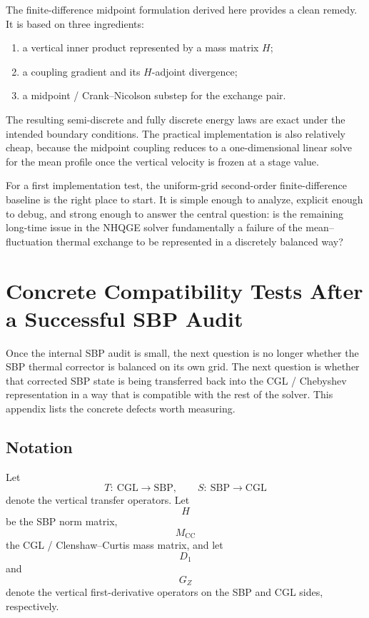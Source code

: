 \documentclass[11pt]{article}
\begin{document}
The finite-difference midpoint formulation derived here provides a clean remedy. It is based on three ingredients:

\begin{enumerate}[label=\arabic*.]
\item a vertical inner product represented by a mass matrix $H$;
\item a coupling gradient and its $H$-adjoint divergence;
\item a midpoint / Crank--Nicolson substep for the exchange pair.
\end{enumerate}

The resulting semi-discrete and fully discrete energy laws are exact under the intended boundary conditions. The practical implementation is also relatively cheap, because the midpoint coupling reduces to a one-dimensional linear solve for the mean profile once the vertical velocity is frozen at a stage value.

For a first implementation test, the uniform-grid second-order finite-difference baseline is the right place to start. It is simple enough to analyze, explicit enough to debug, and strong enough to answer the central question: is the remaining long-time issue in the NHQGE solver fundamentally a failure of the mean--fluctuation thermal exchange to be represented in a discretely balanced way?

\appendix

\section{Concrete Compatibility Tests After a Successful SBP Audit}

Once the internal SBP audit is small, the next question is no longer whether
the SBP thermal corrector is balanced on its own grid. The next question is
whether that corrected SBP state is being transferred back into the
CGL / Chebyshev representation in a way that is compatible with the rest of the
solver. This appendix lists the concrete defects worth measuring.

\subsection{Notation}

Let
\[
T:\ \text{CGL} \to \text{SBP},
\qquad
S:\ \text{SBP} \to \text{CGL}
\]
denote the vertical transfer operators. Let
\[
H
\]
be the SBP norm matrix,
\[
M_{\mathrm{CC}}
\]
the CGL / Clenshaw--Curtis mass matrix, and let
\[
D_1
\]
and
\[
G_Z
\]
denote the vertical first-derivative operators on the SBP and CGL sides,
respectively.
\end{document}
